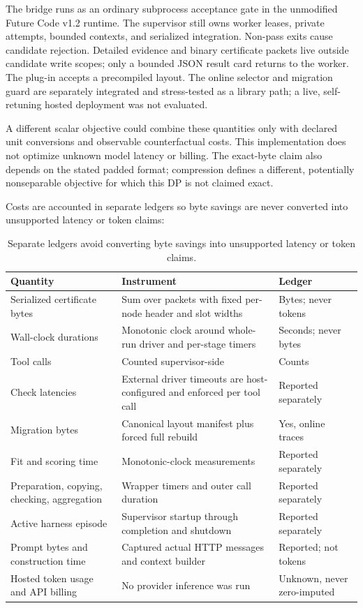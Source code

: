 The bridge runs as an ordinary subprocess acceptance gate in the unmodified
Future Code v1.2 runtime. The supervisor still owns worker leases, private
attempts, bounded contexts, and serialized integration. Non-pass exits cause
candidate rejection. Detailed evidence and binary certificate packets live
outside candidate write scopes; only a bounded JSON result card returns to the
worker. The plug-in accepts a precompiled layout. The online selector and
migration guard are separately integrated and stress-tested as a library path; a
live, self-retuning hosted deployment was not evaluated.

A different scalar objective could combine these quantities only with declared
unit conversions and observable counterfactual costs. This implementation does
not optimize unknown model latency or billing. The exact-byte claim also depends
on the stated padded format; compression defines a different, potentially
nonseparable objective for which this DP is not claimed exact.

Costs are accounted in separate ledgers so byte savings are never converted into
unsupported latency or token claims:

\begin{table}[t]\centering\small
\caption{Separate ledgers avoid converting byte savings into unsupported latency or token claims.}\label{tab:ledgers}
\begin{tabularx}{\linewidth}{@{}lXX@{}}\toprule
Quantity & Instrument & Ledger\\ \midrule
Serialized certificate bytes & Sum over packets with fixed per-node header and slot widths & Bytes; never tokens\\
Wall-clock durations & Monotonic clock around whole-run driver and per-stage timers & Seconds; never bytes\\
Tool calls & Counted supervisor-side & Counts\\
Check latencies & External driver timeouts are host-configured and enforced per tool call & Reported separately\\
Migration bytes & Canonical layout manifest plus forced full rebuild & Yes, online traces\\
Fit and scoring time & Monotonic-clock measurements & Reported separately\\
Preparation, copying, checking, aggregation & Wrapper timers and outer call duration & Reported separately\\
Active harness episode & Supervisor startup through completion and shutdown & Reported separately\\
Prompt bytes and construction time & Captured actual HTTP messages and context builder & Reported; not tokens\\
Hosted token usage and API billing & No provider inference was run & Unknown, never zero-imputed\\
\bottomrule\end{tabularx}\end{table}
